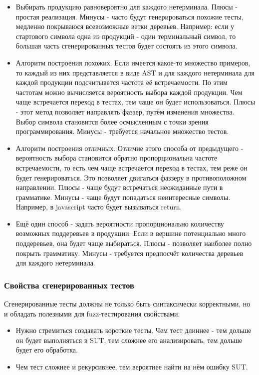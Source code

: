 \documentclass[a4paper]{article}
\begin{document}
\begin{itemize}
\item Выбирать продукцию равновероятно для каждого нетерминала. Плюсы - простая реализация. Минусы - часто будут генерироваться похожие тесты, медленно покрываюся всевозможные ветки деревьев. Например: если у стартового символа одна из продукций - один терминальный символ, то большая часть сгенерированных тестов будет состоять из этого символа.
\item Алгоритм построения похожих\cite{litlink1}. Если имеется какое-то множество примеров, то каждый из них представляется в виде AST и для каждого нетерминала для каждой продукции подсчитывется частота её встречаемости. По этим частотам можно вычисляется вероятность выбора каждой продукции. Чем чаще встречается переход в тестах, тем чаще он будет использоваться. Плюсы - этот метод позволяет направлять фаззер, путём изменения множества. Выбор символа становится более осмысленным с точки зрения программирования. Минусы - требуется начальное множество тестов.
\item Алгоритм построения отличных. Отличие этого способа от предыдущего - вероятность выбора становится обратно пропорциональна частоте встречаемости, то есть чем чаще встречается переход в тестах, тем реже он будет генерироваться. Это позволяет двигаться фаззеру в противоположном направлении. Плюсы - чаще будут встречаться неожиданные пути в грамматике. Минусы - чаще будут попадаться неинтересные символы. Например, в javascript часто будет вызываться return. 
\item Ещё один способ - задать вероятности пропорционально количеству возможных поддеревьев в продукции. Если в вершине потенциально много поддеревьев, она будет чаще выбираться.
Плюсы - позволяет наиболее полно покрыть грамматику. 
Минусы - требуется предпосчёт количества деревьев для каждого нетерминала.
\end{itemize}

\subsubsection{Свойства сгенерированных тестов}
\indent

Сгенерированные тесты должны не только быть синтаксически корректными, но и обладать полезными для fuzz-тестирования свойствами.

\begin{itemize}
\item Нужно стремиться создавать короткие тесты. Чем тест длиннее - тем дольше он будет выполняться в SUT, тем сложнее его анализировать, тем дольше будет его обработка. 
\item Чем тест сложнее и рекурсивнее, тем вероятнее найти на нём ошибку SUT. 
\end{itemize}
\end{document}
